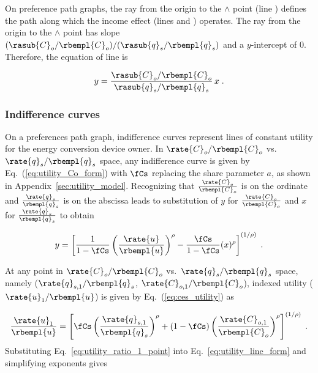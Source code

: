 On preference path graphs, 
the ray from the origin to the $\wedge$ point 
(line \rr{})
defines the path along which the income effect
(lines \hatd{} and \dbar{})
operates.
The ray from the origin to the $\wedge$ point
has slope $(\rasub{C}_o/\rbempl{C}_o) / (\rasub{q}_s/\rbempl{q}_s)$
and a $y$-intercept of 0.
Therefore, the equation of line \rr{} is

\begin{equation} \label{eq:ray_prefs}
  y = \frac{\rasub{C}_o/\rbempl{C}_o}{\rasub{q}_s/\rbempl{q}_s} \, x \; .
\end{equation}


\subsubsection{Indifference curves} 
\label{sec:pref_graph_indifference_curves}

On a preferences path graph, 
indifference curves represent lines of constant utility
for the energy conversion device owner.
In $\rate{C}_o/\rbempl{C}_o$ vs.\ $\rate{q}_s/\rbempl{q}_s$ space, 
any indifference curve 
is given by 
Eq.~(\ref{eq:utility_Co_form})
with $\fCs$ replacing the share parameter $a$, 
as shown in Appendix~\ref{sec:utility_model}.
Recognizing that 
$\frac{\rate{C}_o}{\rbempl{C}_o}$ is on the ordinate and 
$\frac{\rate{q}_s}{\rbempl{q}_s}$ is on the abscissa
leads to substitution of 
$y$ for $\frac{\rate{C}_o}{\rbempl{C}_o}$ and 
$x$ for $\frac{\rate{q}_s}{\rbempl{q}_s}$ to obtain

\begin{equation} \label{eq:utility_line_form}
  y = \left[ \frac{1}{1 - \fCs} \left( \frac{\rate{u}}{\rbempl{u}} \right)^\rho 
            - \frac{\fCs}{1 - \fCs} (x)^\rho \right]^{(1/\rho)} \; .
\end{equation}

At any point in 
$\rate{C}_o/\rbempl{C}_o$ vs.\ $\rate{q}_s/\rbempl{q}_s$ space,
namely ($\rate{q}_{s,1}/\rbempl{q}_s$, $\rate{C}_{o,1}/\rbempl{C}_o$),
indexed utility ($\rate{u}_1/\rbempl{u}$) is given by Eq.~(\ref{eq:ces_utility}) as

\begin{equation} \label{eq:utility_ratio_1_point}
  \frac{\rate{u}_1}{\rbempl{u}} =
        \left[ \fCs \left( \frac{\rate{q}_{s,1}}{\rbempl{q}_s} \right)^\rho
        + (1-\fCs) \left( \frac{\rate{C}_{o,1}}{\rbempl{C}_o} \right)^\rho  \right]^{(1/\rho)} \; .
\end{equation}
%
Substituting Eq.~\ref{eq:utility_ratio_1_point} into Eq.~\ref{eq:utility_line_form} 
and simplifying exponents gives

